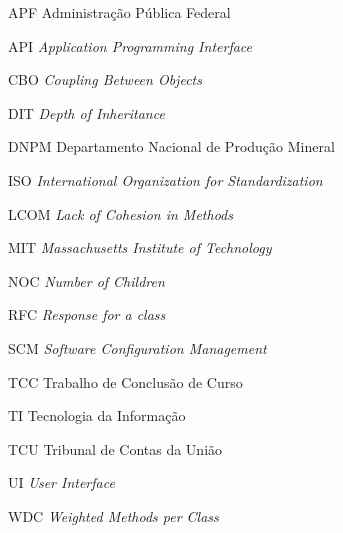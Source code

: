 \begin{siglas}
 \item[APF] Administração Pública Federal
 \item[API] \textit{Application Programming Interface}
 \item[CBO] \textit{Coupling Between Objects}
 \item[DIT] \textit{Depth of Inheritance} 
 \item [DNPM] Departamento Nacional de Produção Mineral 
 \item[ISO] \textit{International Organization for Standardization}
 \item[LCOM] \textit{Lack of Cohesion in Methods}
 \item[MIT] \textit{Massachusetts Institute of Technology}
 \item[NOC] \textit{Number of Children}
 \item[RFC] \textit{Response for a class}
 \item [SCM] \textit{Software Configuration Management}
 \item [TCC] Trabalho de Conclusão de Curso
 \item[TI] Tecnologia da Informação 
 \item[TCU] Tribunal de Contas da União
 \item [UI] \textit{User Interface}
 \item[WDC] \textit{Weighted Methods per Class}
\end{siglas}
